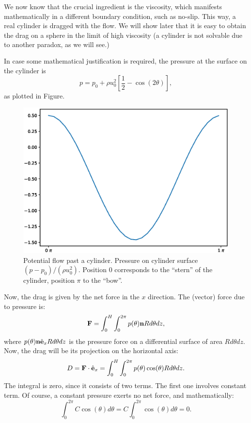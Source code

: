 We now know that the crucial ingredient is the viscosity, which
manifests mathematically in a different boundary condition, such as
no-slip. This way, a real cylinder is dragged with the flow. We will
show later that it is easy to obtain the drag on a sphere in the limit
of high viscosity (a cylinder is not solvable due to another paradox,
as we will see.)

In case some mathematical justification is required, the pressure
at the surface on the cylinder is
\begin{equation}
  \label{eq:press_at_cyl_pot}
  p=   p_0  + \rho  u_0^2  \left[ \frac12 - \cos(2\theta)  \right] ,
\end{equation}
as plotted in Figure.


\begin{figure}
	\centering
	\includegraphics[width=0.7\linewidth]{figures/potential_flow_past_cylinder_p_on_cyl}
	\caption{Potential flow past a cylinder. Pressure on
		cylinder surface $ (p-p_0)/(\rho u_0^2)$. Position $0$ corresponds to the
	``stern'' of the cylinder, position $\pi$ to the ``bow''.   }
	\label{fig:potential_flow_past_cylinder_p_on_cyl}
\end{figure}




Now, the drag is given by the net force in the $x$ direction. The
(vector) force due to pressure is:
\[
\mathbf{F} = \int_0^H \int_0^{2\pi}   p(\theta)  \mathbf{n}  R d\theta  dz ,
\]
where $p(\theta) \mathbf{n} \hat{\mathbf{e}}_x R d\theta dz $ is the pressure force on a
differential surface of area $ R d\theta dz$. Now, the drag will be
its projection on the horizontal axis:
\[
D= \mathbf{F} \cdot \hat{\mathbf{e}}_x = \int_0^H \int_0^{2\pi}
p(\theta) \cos(\theta) R d\theta dz .
\]
The integral is zero, since it consists of two terms. The first one
involves constant term. Of course, a constant pressure exerts no net
force, and mathematically:
\[
 \int_0^{2\pi} C \cos(\theta) d\theta = C  \int_0^{2\pi}  \cos(\theta) d\theta = 0 .
\]

